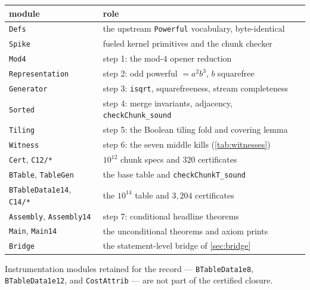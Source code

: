 \documentclass[11pt]{article}
\theoremstyle{definition}
\theoremstyle{remark}
\newcommand{\code}[1]{\texttt{#1}}
\newcommand{\Powerful}{\code{Powerful}}
\begin{document}
\begin{center}\small
\begin{tabular}{l l}
\toprule
module & role \\
\midrule
\code{Defs} & the upstream \Powerful{} vocabulary, byte-identical \\
\code{Spike} & fueled kernel primitives and the chunk checker \\
\code{Mod4} & step 1: the mod-$4$ opener reduction \\
\code{Representation} & step 2: odd powerful $= a^2 b^3$, $b$ squarefree \\
\code{Generator} & step 3: \code{isqrt}, squarefreeness, stream completeness \\
\code{Sorted} & step 4: merge invariants, adjacency, \code{checkChunk\_sound} \\
\code{Tiling} & step 5: the Boolean tiling fold and covering lemma \\
\code{Witness} & step 6: the seven middle kills (\cref{tab:witnesses}) \\
\code{Cert}, \code{C12/*} & $10^{12}$ chunk specs and $320$ certificates \\
\code{BTable}, \code{TableGen} & the base table and \code{checkChunkT\_sound} \\
\code{BTableData1e14}, \code{C14/*} & the $10^{14}$ table and $3{,}204$ certificates \\
\code{Assembly}, \code{Assembly14} & step 7: conditional headline theorems \\
\code{Main}, \code{Main14} & the unconditional theorems and axiom prints \\
\code{Bridge} & the statement-level bridge of \cref{sec:bridge} \\
\bottomrule
\end{tabular}
\end{center}

Instrumentation modules retained for the record ---
\code{BTableData1e8}, \code{BTableData1e12}, and \code{CostAttrib} ---
are not part of the certified closure.
\end{document}
